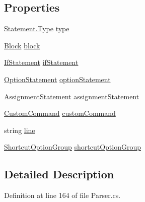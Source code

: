 \subsection*{Properties}
\begin{DoxyCompactItemize}
\item 
\hyperlink{a00168_a518000e4e6219ce5f9f4229f505cd944}{Statement.\-Type} \hyperlink{a00168_aa3fa0eb260e412720562ce06b7dc06fe}{type}
\item 
\hyperlink{a00045}{Block} \hyperlink{a00168_ac14dfc7210974b4cd86402ed011fb0b6}{block}
\item 
\hyperlink{a00120}{If\-Statement} \hyperlink{a00168_a9a71577456598af0f25b23ccd02154e4}{if\-Statement}
\item 
\hyperlink{a00148}{Option\-Statement} \hyperlink{a00168_a15020b7dab4983adbd185d5c2c2ebe84}{option\-Statement}
\item 
\hyperlink{a00041}{Assignment\-Statement} \hyperlink{a00168_a7fa97a80f1b9313bc2bd4194e3f75759}{assignment\-Statement}
\item 
\hyperlink{a00085}{Custom\-Command} \hyperlink{a00168_a8a98e7d4c66f9909da865f0e671d69f2}{custom\-Command}
\item 
string \hyperlink{a00168_a37695c7b00776bb292fd64894a70fb72}{line}
\item 
\hyperlink{a00162}{Shortcut\-Option\-Group} \hyperlink{a00168_a54d73ad69c4af4a0d61edeaea4c8ca4f}{shortcut\-Option\-Group}
\end{DoxyCompactItemize}


\subsection{Detailed Description}


Definition at line 164 of file Parser.\-cs.



